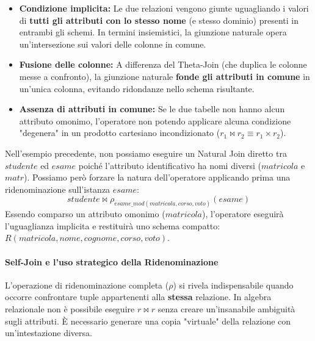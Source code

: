 \begin{itemize}
    \item \textbf{Condizione implicita:} Le due relazioni vengono giunte uguagliando i valori di \textbf{tutti gli attributi con lo stesso nome} (e stesso dominio) presenti in entrambi gli schemi. In termini insiemistici, la giunzione naturale opera un'intersezione sui valori delle colonne in comune.
    \item \textbf{Fusione delle colonne:} A differenza del Theta-Join (che duplica le colonne messe a confronto), la giunzione naturale \textbf{fonde gli attributi in comune} in un'unica colonna, evitando ridondanze nello schema risultante.
    \item \textbf{Assenza di attributi in comune:} Se le due tabelle non hanno alcun attributo omonimo, l'operatore non potendo applicare alcuna condizione "degenera" in un prodotto cartesiano incondizionato ($r_1 \bowtie r_2 \equiv r_1 \times r_2$).
\end{itemize}

\begin{example}
    Nell'esempio precedente, non possiamo eseguire un Natural Join diretto tra $studente$ ed $esame$ poiché l'attributo identificativo ha nomi diversi ($matricola$ e $matr$). Possiamo però forzare la natura dell'operatore applicando prima una ridenominazione sull'istanza $esame$:
    $$ studente \bowtie \rho_{esame\_mod(matricola, corso, voto)}(esame) $$
    Essendo comparso un attributo omonimo ($matricola$), l'operatore eseguirà l'uguaglianza implicita e restituirà uno schema compatto: $R(matricola, nome, cognome, corso, voto)$.
\end{example}

\paragraph{Self-Join e l'uso strategico della Ridenominazione}

L'operazione di ridenominazione completa ($\rho$) si rivela indispensabile quando occorre confrontare tuple appartenenti alla \textbf{stessa} relazione. In algebra relazionale non è possibile eseguire $r \bowtie r$ senza creare un'insanabile ambiguità sugli attributi. È necessario generare una copia "virtuale" della relazione con un'intestazione diversa.

